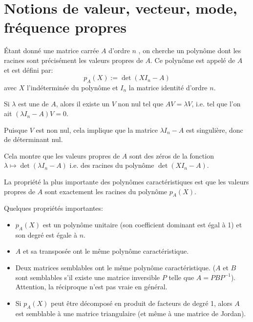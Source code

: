 \medskip
\section{Notions de valeur, vecteur, mode, fréquence propres}

\medskip
Étant donné une matrice carrée $A$ d'ordre $n$ , 
on cherche un polynôme dont les racines sont précisément les valeurs propres de $A$.
Ce polynôme est appelé  
de $A$ et est défini par:
\begin{equation} p_A(X):=\det(XI_n-A)\end{equation}
avec $X$ l'indéterminée du polynôme et $I_n$ la matrice identité d'ordre $n$.


\medskip
Si $\lambda$ est une  de $A$, alors il existe un 
 $V$ non nul tel que $AV = \lambda V$, i.e. 
tel que l'on ait $(\lambda I_n-A)V = 0$.

Puisque $V$ est non nul, cela implique que la matrice $\lambda I_n-A$ est singulière, donc de déterminant nul. 

Cela montre que les valeurs propres de $A$ sont des zéros de la fonction $\lambda\mapsto \det(\lambda I_n - A)$
i.e. des racines du polynôme $\det(XI_n-A)$.

\medskip
La propriété la plus importante des polynômes caractéristiques est que 
les valeurs propres de $A$ sont exactement les racines du polynôme $p_A(X)$. 

\medskip
Quelques propriétés importantes:
\begin{itemize}
   \item $p_A(X)$ est un polynôme unitaire (son coefficient dominant est égal à 1) et son degré 
	est égale à $n$.
   \item $A$ et sa transposée ont le même polynôme caractéristique.
   \item Deux matrices semblables ont le même polynôme caractéristique. ($A$ et $B$ sont semblables s'il 
	existe une matrice inversible $P$ telle que $A = PBP^{-1}$).
	Attention, la réciproque n'est pas vraie en général.
   \item Si $p_A(X)$ peut être décomposé en produit de facteurs de degré 1, alors $A$ est semblable
	à une matrice triangulaire (et même à une matrice de Jordan).
\end{itemize}


